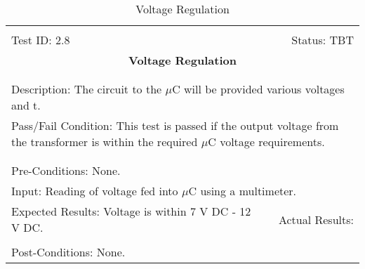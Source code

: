 \documentclass[titlepage]{article}
\begin{document}
\begin{center}%
\begin{table}[h!]
\begin{tabular}{|l r|}\hline&\\[-2mm]
	Test ID: 2.8	&Status: TBT\\[-3mm]
	\multicolumn{2}{|c|}{\textbf{\large{Voltage Regulation}}}\\&\\\hline&\\[-3mm]
	\multicolumn{2}{|p{\textwidth}|}{Description: The circuit to the $\mu$C will be provided various voltages and t.}\\[1mm]
	\multicolumn{2}{|p{\textwidth}|}{Pass/Fail Condition: This test is passed if the output voltage from the transformer is within the required $\mu$C voltage requirements.}\\[1mm]\hline&\\[-3mm]\hline&\\[-3mm]%
	\multicolumn{2}{|p{\textwidth}|}{Pre-Conditions: None.}\\[4mm]
	\multicolumn{2}{|p{\textwidth}|}{Input: Reading of voltage fed into $\mu$C using a multimeter.}\\[2mm]\hline
	\multicolumn{1}{|p{0.49\textwidth}}{Expected Results: Voltage is within 7 V DC - 12 V DC.}	&\multicolumn{1}{|p{0.45\textwidth}|}{Actual Results:}\\\hline&\\[-3mm]
	\multicolumn{2}{|p{\textwidth}|}{Post-Conditions: None.}\\\hline
\end{tabular}
\caption{Voltage Regulation}
\end{table}
\end{center}
\newpage
\end{document}
